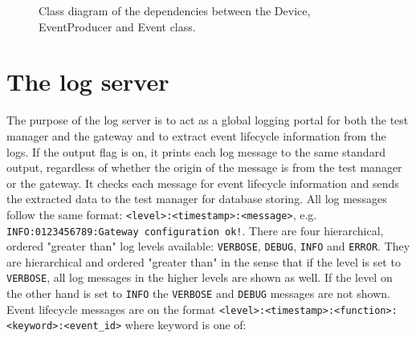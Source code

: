 \begin{figure}[h!]
    \centering

    \caption[Class diagram of name service components.]{Class diagram of the
    dependencies between the Device, EventProducer and Event class.}

    \label{fig:device_class_diagram}
\end{figure}

\section{The log server}
\label{sec:log_server}

The purpose of the log server is to act as a global logging portal for both the
test manager and the gateway and to extract event lifecycle information from
the logs. If the output flag is on, it prints each log message to the same
standard output, regardless of whether the origin of the message is from the
test manager or the gateway. It checks each message for event lifecycle
information and sends the extracted data to the test manager for database
storing. All log messages follow the same format:
\texttt{<level>:<timestamp>:<message>}, e.g. \texttt{INFO:0123456789:Gateway
configuration ok!}. There are four hierarchical, ordered "greater than" log
levels available: \texttt{VERBOSE}, \texttt{DEBUG}, \texttt{INFO} and
\texttt{ERROR}. They are hierarchical and ordered "greater than" in the sense
that if the level is set to \texttt{VERBOSE}, all log messages in the higher
levels are shown as well. If the level on the other hand is set to
\texttt{INFO} the \texttt{VERBOSE} and \texttt{DEBUG} messages are not shown.
Event lifecycle messages are on the format
\texttt{<level>:<timestamp>:<function>:<keyword>:<event\_id>} where keyword is
one of:

